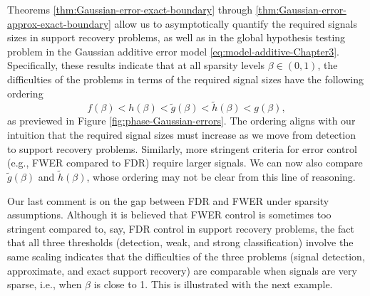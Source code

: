  
Theorems \ref{thm:Gaussian-error-exact-boundary} through \ref{thm:Gaussian-error-approx-exact-boundary} allow us to asymptotically quantify the required signals sizes in support recovery problems, as well as in the global hypothesis testing problem in the Gaussian additive error model \eqref{eq:model-additive-Chapter3}. 
Specifically, these results indicate that at all sparsity levels $\beta\in(0,1)$, the difficulties of the problems in terms of the required signal sizes have the following ordering
$$
f(\beta) < h(\beta) < \widetilde{g}(\beta) < \widetilde{h}(\beta) < g(\beta),
$$
as previewed in Figure \ref{fig:phase-Gaussian-errors}.
The ordering aligns with our intuition that the required signal sizes must increase as we move from detection to support recovery problems.
Similarly, more stringent criteria for error control (e.g., FWER compared to FDR) require larger signals.
We can now also compare $\widetilde{g}(\beta)$ and $\widetilde{h}(\beta)$, whose ordering may not be clear from this line of reasoning.


\medskip

Our last comment is on the gap between FDR and FWER under sparsity assumptions. 
Although it is believed that FWER control is sometimes too stringent compared to, say, FDR control in support recovery problems, the fact that all three thresholds (detection, weak, and strong classification) involve the same scaling indicates that the difficulties of the three problems (signal detection, approximate, and exact support recovery) are comparable when signals are very sparse, i.e., when $\beta$ is close to 1.
This is illustrated with the next example.

